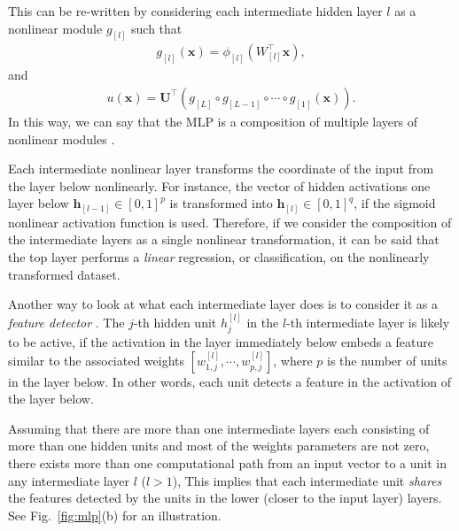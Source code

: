 \documentclass{now}
\newcommand{\qlay}[1]{\left[#1\right]}
\newcommand{\vect}[1]{\mathbf{#1}}
\newcommand{\matr}[1]{\mathbf{#1}}
\newcommand{\vh}[0]{\vect{h}}
\newcommand{\vx}[0]{\vect{x}}
\newcommand{\mU}[0]{\matr{U}}
\begin{document}
This can be re-written by considering each intermediate
hidden layer $l$ as a nonlinear module $g_{\qlay{l}}$ such that
\begin{align*}
    g_{\qlay{l}}(\vx) = \phi_{\qlay{l}}(W_{\qlay{l}}^\top \vx),
\end{align*}
and
\begin{align*}
    u(\vx) = \mU^\top 
    \left(g_{\qlay{L}} \circ g_{\qlay{L-1}} \circ \cdots
    \circ g_{\qlay{1}} (\vx) \right).
\end{align*}
In this way, we can say that the MLP is a composition of
multiple layers of nonlinear modules \citep{Bengio2007a}.

Each intermediate nonlinear layer transforms the coordinate
of the input from the layer below nonlinearly. For instance,
the vector of hidden activations one layer below
$\vh_{\qlay{l-1}} \in \left[ 0, 1\right]^p$ is transformed into
$\vh_{\qlay{l}} \in \left[0, 1\right]^q$, if the sigmoid nonlinear
activation function is used. Therefore, if we consider the
composition of the intermediate layers as a single nonlinear
transformation, it can be said that the top layer performs a
\textit{linear} regression, or classification, on the
nonlinearly transformed dataset. 

Another way to look at what each intermediate layer does is
to consider it as a \textit{feature detector} \citep[see,
e.g.,][]{Haykin2009}. The $j$-th hidden unit $h_j^{\qlay{l}}$ in
the $l$-th intermediate layer is likely to be active, if the
activation in the layer immediately below embeds a feature
similar to the associated weights $\left[ w_{1,j}^{\qlay{l}},
\cdots, w_{p,j}^{\qlay{l}} \right]$, where $p$ is the number of
units in the layer below. In other words, each unit detects
a feature in the activation of the layer below.

Assuming that there are more than one intermediate layers each
consisting of more than one hidden units and most of the weights
parameters are not zero, there exists more than one computational
path from an input vector to a unit in any intermediate layer $l$
($l > 1$),  This implies that each intermediate unit
\textit{shares} the features detected by the units in the lower
(closer to the input layer) layers.  See Fig.~\ref{fig:mlp}(b)
    for an illustration.
\end{document}
